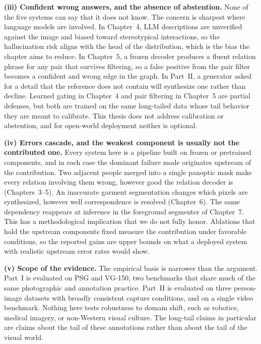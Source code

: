 \noindent \textbf{(iii) Confident wrong answers, and the absence of abstention.}
None of the five systems can say that it does not know. The concern is sharpest where language models are involved. In Chapter~4, LLM descriptions are unverified against the image and biased toward stereotypical interactions, so the hallucination risk aligns with the head of the distribution, which is the bias the chapter aims to reduce. In Chapter~5, a frozen decoder produces a fluent relation phrase for any pair that survives filtering, so a false positive from the pair filter becomes a confident and wrong edge in the graph. In Part~II, a generator asked for a detail that the reference does not contain will synthesize one rather than decline. Learned gating in Chapter~4 and pair filtering in Chapter~5 are partial defenses, but both are trained on the same long-tailed data whose tail behavior they are meant to calibrate. This thesis does not address calibration or abstention, and for open-world deployment neither is optional.

\noindent \textbf{(iv) Errors cascade, and the weakest component is usually not the contributed one.}
Every system here is a pipeline built on frozen or pretrained components, and in each case the dominant failure mode originates upstream of the contribution. Two adjacent people merged into a single panoptic mask make every relation involving them wrong, however good the relation decoder is (Chapters~3--5). An inaccurate garment segmentation changes which pixels are synthesized, however well correspondence is resolved (Chapter~6). The same dependency reappears at inference in the foreground segmenter of Chapter~7. This has a methodological implication that we do not fully honor. Ablations that hold the upstream components fixed measure the contribution under favorable conditions, so the reported gains are upper bounds on what a deployed system with realistic upstream error rates would show.

\noindent \textbf{(v) Scope of the evidence.}
The empirical basis is narrower than the argument. Part~I is evaluated on PSG and VG-150, two benchmarks that share much of the same photographic and annotation practice. Part~II is evaluated on three person-image datasets with broadly consistent capture conditions, and on a single video benchmark. Nothing here tests robustness to domain shift, such as robotics, medical imagery, or non-Western visual culture. The long-tail claims in particular are claims about the tail of these annotations rather than about the tail of the visual world.

